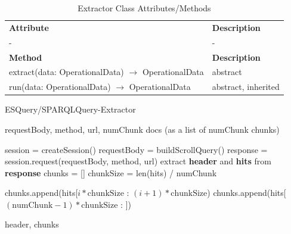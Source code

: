 \begin{table}[H]
	\centering
	\begin{tabular}{|p{}|p{}|}
		\hline
		\textbf{Attribute} & \textbf{Description} \\ 
		- & - \\
		\hline
		\hline
		\textbf{Method} & \textbf{Description} \\ 
		\hline
		extract(data: OperationalData) $\rightarrow$ OperationalData & abstract \\
		\hline
		run(data: OperationalData) $\rightarrow$ OperationalData & abstract, inherited \\
		\hline
	\end{tabular}
	\caption{Extractor Class Attributes/Methods}
	\label{tab:class_attr_extractor}
\end{table}

\begin{algorithm}
\caption{ESQuery/SPARQLQuery-Extractor}\label{alg:etl_extractor}
\begin{algorithmic}
\Require requestBody, method, url, numChunk
\Ensure docs (as a list of numChunk chunks)

\State session = createSession()	
	
	\State requestBody = buildScrollQuery()	
\EndIf
% 
\State response = session.request(requestBody, method, url)
\State extract \textbf{header} and \textbf{hits} from \textbf{response}
\State chunks = []	
\State chunkSize = len(hits) / numChunk

	\State chunks.append(hits[$i*\text{chunkSize}$ : $(i+1)*\text{chunkSize}$)	
\EndFor
\State chunks.append(hits[$(\text{numChunk}-1)*\text{chunkSize}$ : ])	

\State \Return header, chunks
\end{algorithmic}
\end{algorithm}

